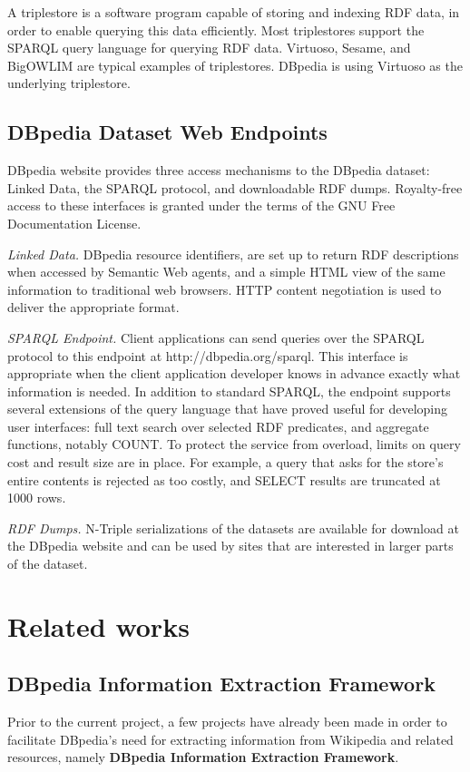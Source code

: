 \documentclass[thesis=M,english,hidelinks]{FITthesis}[2019/12/23]
\begin{document}
A triplestore is a software program capable of storing and indexing RDF data, in order to enable querying this data efficiently. Most triplestores support the SPARQL query language for querying RDF data. Virtuoso, Sesame, and BigOWLIM are typical examples of triplestores. DBpedia is using Virtuoso as the underlying triplestore.

\subsection{DBpedia Dataset Web Endpoints}

DBpedia website provides three access mechanisms to the DBpedia dataset: Linked Data, the SPARQL protocol, and downloadable RDF dumps. Royalty-free access to these interfaces is granted under the terms of the GNU Free Documentation License\cite{dbpedia_live_sparql}.

\textit{Linked Data.} DBpedia resource identifiers, are set up to return RDF descriptions when accessed by Semantic Web agents, and a simple HTML view of the same information to traditional web browsers. HTTP content negotiation is used to deliver the appropriate format.

\textit{SPARQL Endpoint.} Client applications can send queries over the SPARQL protocol to this
endpoint at http://dbpedia.org/sparql. This interface is appropriate when the client application developer knows in advance exactly what information is needed. In addition to standard SPARQL, the endpoint supports several extensions of the query language that have proved useful for developing user interfaces: full text search over selected RDF predicates, and aggregate functions, notably COUNT. To protect the service from overload, limits on query cost and result size are in place. For example, a query that asks for the store’s entire contents is rejected as too costly, and SELECT results are truncated at 1000 rows.

\textit{RDF Dumps.} N-Triple serializations of the datasets are available for download at the DBpedia website and can be used by sites that are interested in larger parts of the dataset.

\section{Related works}

\subsection{DBpedia Information Extraction Framework}\label{dbpedia_in_extraction_framework}
Prior to the current project, a few projects have already been made in order to facilitate DBpedia's need for extracting information from Wikipedia and related resources, namely \textbf{DBpedia Information Extraction Framework}\cite{dbpedia_live_extraction}. 
\end{document}
